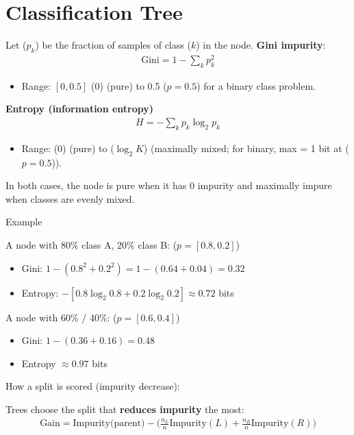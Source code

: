 \section{Classification Tree}

Let ($p_k$) be the fraction of samples of class ($k$) in the node.
\textbf{Gini impurity}:
\begin{align*}
  \text{Gini} = 1 - \sum_{k} p_k^2
\end{align*}
\begin{itemize}
	\item Range: $[0, 0.5]$ (0) (pure) to  0.5 ($p=0.5$) for a binary class problem.
\end{itemize}

\textbf{Entropy (information entropy)}
\begin{align*}
  H = -\sum_{k} p_k \log_2 p_k
\end{align*}
\begin{itemize}
	\item Range: (0) (pure) to ($\log_2 K$) (maximally mixed; for binary, max = 1 bit at ($p=0.5$)).
\end{itemize}

In both cases, the node is pure when it has 0 impurity and maximally impure when classes are evenly mixed.

\begin{commentbox}{Example}

A node with 80\% class A, 20\% class B: ($p=[0.8,0.2]$)
\begin{itemize}
	\item Gini: $1 - (0.8^2 + 0.2^2) = 1 - (0.64+0.04) = 0.32$
	\item Entropy: $-[0.8\log_2 0.8 + 0.2\log_2 0.2] \approx 0.72$ bits
\end{itemize}

A node with 60\% / 40\%: ($p=[0.6,0.4]$)
\begin{itemize}
	\item Gini: $1 - (0.36 + 0.16) = 0.48$
	\item Entropy $\approx 0.97$ bits
\end{itemize}
\end{commentbox}

How a split is scored (impurity decrease):

Trees choose the split that \textbf{reduces impurity} the most:
\begin{align*}
	\text{Gain} = \text{Impurity(parent)} - \Big(\tfrac{n_L}{n}\text{Impurity}(L) + \tfrac{n_R}{n}\text{Impurity}(R)\Big)
\end{align*}

